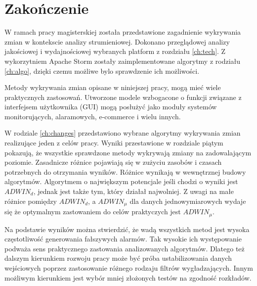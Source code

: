 \chapter{Zakończenie}
W ramach pracy magisterskiej została przedstawione zagadnienie wykrywania zmian w kontekscie analizy strumieniowej.
Dokonano przeglądowej analizy jakościowej i wydajnościowej wybranych platform z rozdziału \ref{ch:tech}.
Z wykorzytniem Apache Storm zostały zaimplementowane algorytmy z rodziału \ref{ch:algo},
dzięki czemu możliwe bylo sprawdzenie ich możliwości.

Metody wykrywania zmian opisane w niniejszej pracy,
mogą mieć wiele praktycznych zastosowań.
Utworzone modele wzbogacone o funkcji związane z interfejsem użytkownika (GUI) mogą posłużyć
jako moduły systemów monitorujących, alaramowych, e-commerce i wielu innych.

W rodziale \ref{ch:changes} przedstawiono wybrane algorytmy wykrywania zmian realizujące jeden z celów pracy.
Wyniki przestawione w rozdziale piątym pokazują,
że wszystkie sprawdzone metody wykrywają zmiany na zadowalającym poziomie.
Zasadnicze różnice pojawiają się w zużyciu zasobów i czasach potrzebnych do otrzymania wyników.
Różnice wynikają w wewnętrznej budowy algorytmów.
Algorytmem o największym potencjale jeśli chodzi o wyniki jest $ADWIN_d$,
jednak jest także tym, który działał najwolniej.
Z uwagi na małe różnice pomiędzy $ADWIN_d$, a $ADWIN_\mu$ dla danych jednowymiarowych
wydaje się że optymalnym zastowaniem do celów praktyczych jest $ADWIN_\mu$.

Na podstawie wyników można stwierdzić,
że wadą wszystkich metod jest wysoka częstotliwość generowania fałszywych alarmów.
Tak wysokie ich występowanie podważa sens praktycznego zastowania analizowanych algorytmów.
Dlatego też dalszym kierunkiem rozwoju pracy może być próba ustabilizowania danych wejściowych
poprzez zastosowanie różnego rodzaju filtrów wygładzających.
Innym możliwym kierunkiem jest wybór mniej złożonych testów na zgodność rozkładów.
